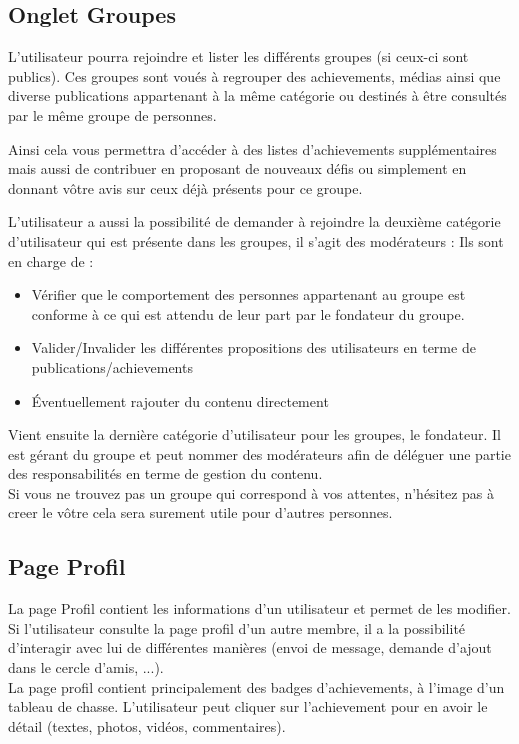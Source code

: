 \documentclass{life-fr}
\begin{document}
\subsection{Onglet Groupes}

L'utilisateur pourra rejoindre et lister les différents groupes (si ceux-ci sont publics). Ces groupes sont voués à regrouper des achievements, médias ainsi que diverse publications appartenant à la même catégorie ou destinés à être consultés par le même groupe de personnes.

Ainsi cela vous permettra d'accéder à des listes d'achievements supplémentaires mais aussi de contribuer en proposant de nouveaux défis ou simplement en donnant vôtre avis sur ceux déjà présents pour ce groupe.

L'utilisateur a aussi la possibilité de demander à rejoindre la deuxième catégorie d'utilisateur qui est présente dans les groupes, il s'agit des modérateurs : Ils sont en charge de :

\begin{itemize}
\item Vérifier que le comportement des personnes appartenant au groupe est conforme à ce qui est attendu de leur part par le fondateur du groupe.
\item Valider/Invalider les différentes propositions des utilisateurs en terme de publications/achievements
\item Éventuellement rajouter du contenu directement
\end{itemize}

Vient ensuite la dernière catégorie d'utilisateur pour les groupes, le fondateur. Il est gérant du groupe et peut nommer des modérateurs afin de déléguer une partie des responsabilités en terme de gestion du contenu. \\ 

Si vous ne trouvez pas un groupe qui correspond à vos attentes, n'hésitez pas à creer le vôtre cela sera surement utile pour d'autres personnes.

\subsection{Page Profil}

La page Profil contient les informations d'un utilisateur et permet de les modifier. Si l'utilisateur consulte la page profil d'un autre membre, il a la possibilité d'interagir avec lui de différentes manières (envoi de message, demande d'ajout dans le cercle d'amis, ...).\\
La page profil contient principalement des badges d'achievements, à l'image d'un tableau de chasse. L'utilisateur peut cliquer sur l'achievement pour en avoir le détail (textes, photos, vidéos, commentaires).
\end{document}
